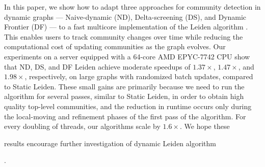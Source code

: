 In this paper, we show how to adapt three approaches for community detection in dynamic graphs --- Naive-dynamic (ND), Delta-screening (DS), and Dynamic Frontier (DF) --- to a fast multicore implementation \cite{sahu2024fast} of the Leiden algorithm \cite{com-traag19}. This enables users to track community changes over time while reducing the computational cost of updating communities as the graph evolves. Our experiments on a server equipped with a 64-core AMD EPYC-7742 CPU show that ND, DS, and DF Leiden achieve moderate speedups of $1.37\times$, $1.47\times$, and $1.98\times$, respectively, on large graphs with randomized batch updates, compared to Static Leiden. These small gains are primarily because we need to run the algorithm for several passes, similar to Static Leiden, in order to obtain high quality top-level communities, and the reduction in runtime occurs only during the local-moving and refinement phases of the first pass of the algorithm. For every doubling of threads, our algorithms scale by $1.6\times$. We hope these results encourage further investigation of dynamic Leiden algorithm.
